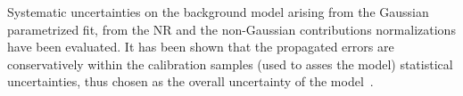 Systematic uncertainties on the background model arising from the Gaussian parametrized fit, from the NR and the non-Gaussian contributions normalizations
have been evaluated. It has been shown that the propagated errors are conservatively within the calibration samples (used to asses the model) statistical uncertainties, 
thus  chosen as the overall uncertainty of the model~\cite{xe100_run_combination}. 
